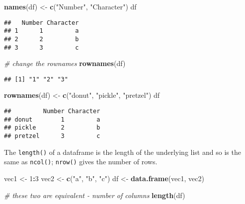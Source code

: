 \documentclass[
]{book}
\newenvironment{Shaded}{\begin{snugshade}}{\end{snugshade}}
\newcommand{\CommentTok}[1]{\textcolor[rgb]{0.56,0.35,0.01}{\textit{#1}}}
\newcommand{\DecValTok}[1]{\textcolor[rgb]{0.00,0.00,0.81}{#1}}
\newcommand{\KeywordTok}[1]{\textcolor[rgb]{0.13,0.29,0.53}{\textbf{#1}}}
\newcommand{\NormalTok}[1]{#1}
\newcommand{\OperatorTok}[1]{\textcolor[rgb]{0.81,0.36,0.00}{\textbf{#1}}}
\newcommand{\StringTok}[1]{\textcolor[rgb]{0.31,0.60,0.02}{#1}}
\begin{document}
\begin{Shaded}
\begin{Highlighting}[]
\KeywordTok{names}\NormalTok{(df) \textless{}{-}}\StringTok{ }\KeywordTok{c}\NormalTok{(}\StringTok{"Number"}\NormalTok{, }\StringTok{"Character"}\NormalTok{)}
\NormalTok{df}
\end{Highlighting}
\end{Shaded}

\begin{verbatim}
##   Number Character
## 1      1         a
## 2      2         b
## 3      3         c
\end{verbatim}

\begin{Shaded}
\begin{Highlighting}[]
\CommentTok{\# change the rownames}
\KeywordTok{rownames}\NormalTok{(df)}
\end{Highlighting}
\end{Shaded}

\begin{verbatim}
## [1] "1" "2" "3"
\end{verbatim}

\begin{Shaded}
\begin{Highlighting}[]
\KeywordTok{rownames}\NormalTok{(df) \textless{}{-}}\StringTok{ }\KeywordTok{c}\NormalTok{(}\StringTok{"donut"}\NormalTok{, }\StringTok{"pickle"}\NormalTok{, }\StringTok{"pretzel"}\NormalTok{)}
\NormalTok{df}
\end{Highlighting}
\end{Shaded}

\begin{verbatim}
##         Number Character
## donut        1         a
## pickle       2         b
## pretzel      3         c
\end{verbatim}

The \texttt{length()} of a dataframe is the length of the underlying list and so is the same as \texttt{ncol()}; \texttt{nrow()} gives the number of rows.

\begin{Shaded}
\begin{Highlighting}[]
\NormalTok{vec1 \textless{}{-}}\StringTok{ }\DecValTok{1}\OperatorTok{:}\DecValTok{3}
\NormalTok{vec2 \textless{}{-}}\StringTok{ }\KeywordTok{c}\NormalTok{(}\StringTok{"a"}\NormalTok{, }\StringTok{"b"}\NormalTok{, }\StringTok{"c"}\NormalTok{)}
\NormalTok{df \textless{}{-}}\StringTok{ }\KeywordTok{data.frame}\NormalTok{(vec1, vec2)}

\CommentTok{\# these two are equivalent {-} number of columns}
\KeywordTok{length}\NormalTok{(df)}
\end{Highlighting}
\end{Shaded}
\end{document}
